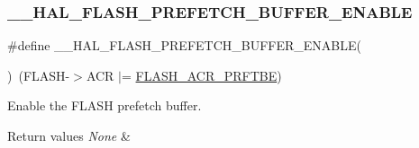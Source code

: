 \subsubsection{\texorpdfstring{\+\_\+\+\_\+\+H\+A\+L\+\_\+\+F\+L\+A\+S\+H\+\_\+\+P\+R\+E\+F\+E\+T\+C\+H\+\_\+\+B\+U\+F\+F\+E\+R\+\_\+\+E\+N\+A\+B\+LE}{\_\_HAL\_FLASH\_PREFETCH\_BUFFER\_ENABLE}}
{\footnotesize\ttfamily \#define \+\_\+\+\_\+\+H\+A\+L\+\_\+\+F\+L\+A\+S\+H\+\_\+\+P\+R\+E\+F\+E\+T\+C\+H\+\_\+\+B\+U\+F\+F\+E\+R\+\_\+\+E\+N\+A\+B\+LE(\begin{DoxyParamCaption}{ }\end{DoxyParamCaption})~(F\+L\+A\+SH-\/$>$A\+CR $\vert$= \hyperlink{group___peripheral___registers___bits___definition_ga5285ab198307213dce0629f9b7c6fc86}{F\+L\+A\+S\+H\+\_\+\+A\+C\+R\+\_\+\+P\+R\+F\+T\+BE})}



Enable the F\+L\+A\+SH prefetch buffer. 


\begin{DoxyRetVals}{Return values}
{\em None} & \\
\hline
\end{DoxyRetVals}
